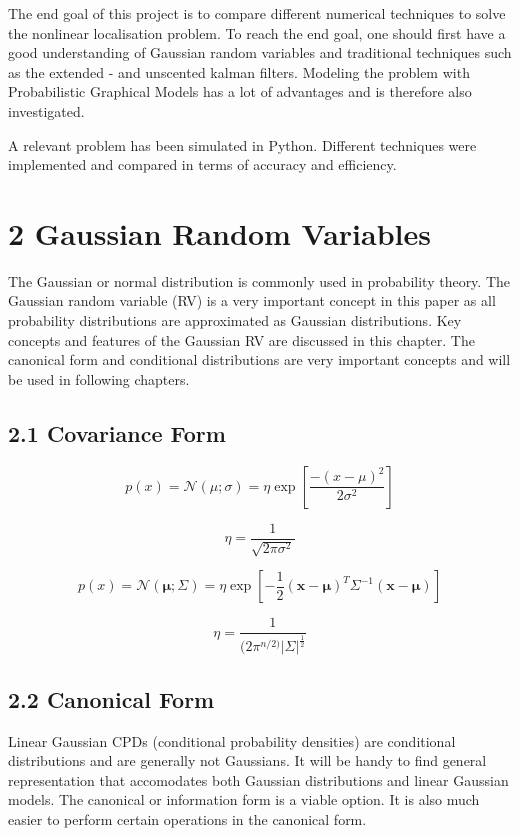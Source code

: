 \documentclass[12pt,oneside,openany,a4paper, %
afrikaans,english,
]{memoir}
\numberwithin{equation}{chapter}
\begin{document}
The end goal of this project is to compare different numerical techniques to solve the nonlinear localisation problem. To reach the end goal, one should first have a good understanding of Gaussian random variables and traditional techniques such as the extended - and unscented kalman filters. Modeling the problem with Probabilistic Graphical Models has a lot of advantages and is therefore also investigated. 

A relevant problem has been simulated in Python. Different techniques were implemented and compared in terms of accuracy and efficiency.

\chapter{2 Gaussian Random Variables}
\setcounter{chapter}{2}
The Gaussian or normal distribution is commonly used in probability theory. The Gaussian random variable (RV) is a very important concept in this paper as all probability distributions are approximated as Gaussian distributions. Key concepts and features of the Gaussian RV are discussed in this chapter. The canonical form and conditional distributions are very important concepts and will be used in following chapters.

\section{2.1 Covariance Form}

\begin{equation}\label{eq:1}
p(x) = \mathcal{N}(\mu;\sigma) = \eta\exp\left[\frac{-(x-\mu)^2}{2\sigma^2}\right]
\end{equation}

\begin{equation}\label{eq:2}
\eta = \frac{1}{\sqrt{2\pi\sigma^2}}
\end{equation}

\begin{equation}\label{eq:3}
p(x) = \mathcal{N}(\bm{\mu};\Sigma) = \eta\exp\left[-\frac{1}{2}(\bm{x}-\bm{\mu})^T\Sigma^{-1}(\bm{x}-\bm{\mu})\right]
\end{equation}

\begin{equation}\label{eq:4}
\eta = \frac{1}{(2\pi^{n/2)}|\Sigma|^{\frac{1}{2}}}
\end{equation}

\section{2.2 Canonical Form}
Linear Gaussian CPDs (conditional probability densities) are conditional distributions and are generally not Gaussians. It will be handy to find general representation that accomodates both Gaussian distributions and linear Gaussian models. The canonical or information form is a viable option. It is also much easier to perform certain operations in the canonical form. 
\end{document}
